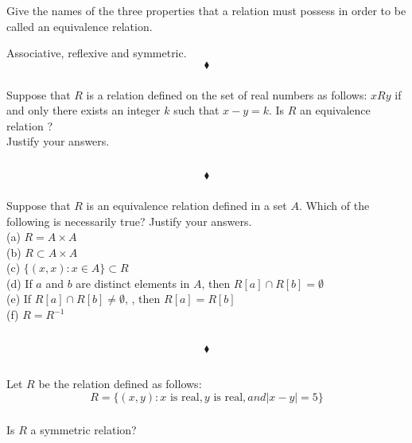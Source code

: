 \subsubsection{}
\begin{tcolorbox}
Give the names of the three properties that a relation must possess in order to be called an equivalence relation.
\end{tcolorbox}
$$ $$
Associative, reflexive and symmetric.
$$\blacklozenge$$

\subsubsection{}
\begin{tcolorbox}
Suppose that $R$ is a relation defined on the set of real numbers  as follows: $xRy$ if and only there exists an integer $k$ such that $x-y=k$. Is $R$ an equivalence relation ?\\
Justify your answers.
\end{tcolorbox}
$$ $$

$$\blacklozenge$$
\subsubsection{}
\begin{tcolorbox}
Suppose that $R$  is an equivalence relation defined in a set $A$. Which of the following is necessarily true? Justify your answers.\\
(a) $R=A\times A$\\
(b) $R\subset  A \times A$ \\
(c) $\{(x, x):x \in  A\}\subset R$\\
(d) If $a$ and $b$ are distinct elements in $A$, then $R[a]\cap R[b] =\emptyset $\\
(e) If $R[a] \cap  R[b] \neq \emptyset$, , then $R[a]=R[b]$\\
(f) $R= R^{-1}$
\end{tcolorbox}
$$ $$

$$\blacklozenge$$

\renewcommand{\thesubsection}{\thesection.\RomanNumeralCaps{4}}
\subsection{}
Let $R$ be the relation defined as follows: 
$$R = \{(x, y):x \text{ is real}, y \text{ is real}, and |x - y| =5\} $$

\subsubsection{}
\begin{tcolorbox}
Is $R$ a symmetric relation? 
\end{tcolorbox}
$$ $$
 
